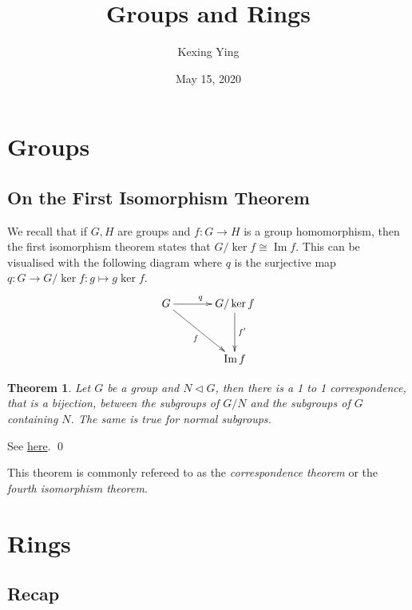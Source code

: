 \documentclass[
]{article}
\title{Groups and Rings}
\author{Kexing Ying}
\date{May 15, 2020}
\newtheorem{theorem}{Theorem}
\begin{document}
\maketitle

{
\hypersetup{linkcolor=}
\setcounter{tocdepth}{2}
\tableofcontents
}
\hypertarget{groups}{%
\section{Groups}\label{groups}}

\hypertarget{on-the-first-isomorphism-theorem}{%
\subsection{On the First Isomorphism
Theorem}\label{on-the-first-isomorphism-theorem}}

We recall that if \(G, H\) are groups and \(f : G \to H\) is a group
homomorphism, then the first isomorphism theorem states that
\(G / \ker f \cong \mathop{\mathrm{Im}}f\). This can be visualised with
the following diagram where \(q\) is the surjective map
\(q : G \to G / \ker f : g \mapsto g \ker f\). \[
  \xymatrix @ R=1.2cm @ C=1.2cm {
  G \ar[r]^{q} \ar[rd]_{f} & G / \ker f \ar[d]^{f'} \\
  & \mathop{\mathrm{Im}}f
  }
\]

\begin{theorem}
  Let \(G\) be a group and \(N \triangleleft G\), then there is a 1 to 1 
  correspondence, that is a bijection, between the subgroups of \(G / N\) and 
  the subgroups of \(G\) containing \(N\). The same is true for normal subgroups.
\end{theorem}
\proof

See
\href{https://github.com/ImperialCollegeLondon/group-theory-game/blob/master/src/hom/isomorphism.lean\#L391}{here}.
\qed

This theorem is commonly refereed to as the \emph{correspondence
theorem} or the \emph{fourth isomorphism theorem}.

\hypertarget{rings}{%
\section{Rings}\label{rings}}

\hypertarget{recap}{%
\subsection{Recap}\label{recap}}
\end{document}
